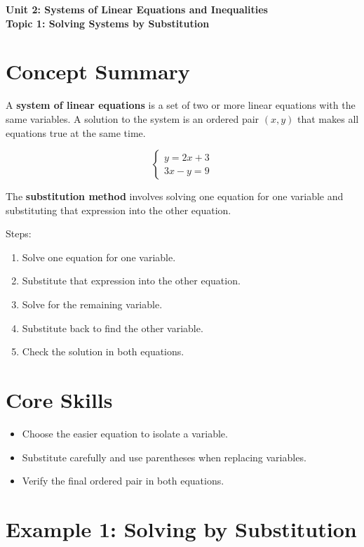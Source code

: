 \documentclass[14pt]{extarticle}
\newcommand{\UnitTitle}{Unit 2: Systems of Linear Equations and Inequalities}
\newcommand{\TopicTitle}{Topic 1: Solving Systems by Substitution}
\begin{document}
\raggedright
{}

\begin{center}
    \LARGE \textbf{\UnitTitle} \\[6pt]
    \Large \textbf{\TopicTitle}
\end{center}

\vspace{1em}

\section*{Concept Summary}

A \textbf{system of linear equations} is a set of two or more linear equations with the same variables.  
A solution to the system is an ordered pair \((x, y)\) that makes all equations true at the same time.

\[
\begin{cases}
y = 2x + 3 \\
3x - y = 9
\end{cases}
\]

The \textbf{substitution method} involves solving one equation for one variable and substituting that expression into the other equation.

Steps:
\begin{enumerate}
    \item Solve one equation for one variable.
    \item Substitute that expression into the other equation.
    \item Solve for the remaining variable.
    \item Substitute back to find the other variable.
    \item Check the solution in both equations.
\end{enumerate}

\section*{Core Skills}
\begin{itemize}
    \item Choose the easier equation to isolate a variable.
    \item Substitute carefully and use parentheses when replacing variables.
    \item Verify the final ordered pair in both equations.
\end{itemize}

\section*{Example 1: Solving by Substitution}
\end{document}
